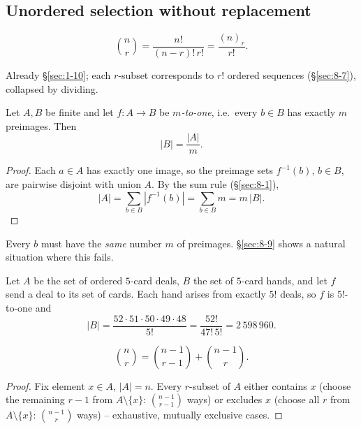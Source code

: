 \documentclass[11pt]{article}
\begin{document}
\subsection{Unordered selection without replacement}
\label{sec:8-8}

\begin{theorem}
\[
\binom{n}{r} = \frac{n!}{(n-r)!\,r!} = \frac{(n)_r}{r!}.
\]
\end{theorem}
\begin{note}
Already \S\ref{sec:1-10}; each $r$-subset corresponds to $r!$ ordered sequences (\S\ref{sec:8-7}), collapsed by dividing.
\end{note}

\bigskip
\begin{theorem}
\label{thm:divisionrule}
Let $A,B$ be finite and let $f:A\to B$ be \emph{$m$-to-one}, i.e.\ every $b\in B$ has exactly $m$ preimages. Then
\[
|B| = \frac{|A|}{m}.
\]
\end{theorem}
\begin{proof}
Each $a\in A$ has exactly one image, so the preimage sets $f^{-1}(b)$, $b\in B$, are pairwise disjoint with union $A$. By the sum rule (\S\ref{sec:8-1}),
\[
|A| = \sum_{b\in B}\left|f^{-1}(b)\right| = \sum_{b\in B} m = m\,|B|.
\]
\end{proof}
\begin{note}
Every $b$ must have the \emph{same} number $m$ of preimages. \S\ref{sec:8-9} shows a natural situation where this fails.
\end{note}

\begin{example}
Let $A$ be the set of ordered $5$-card deals, $B$ the set of $5$-card hands, and let $f$ send a deal to its set of cards. Each hand arises from exactly $5!$ deals, so $f$ is $5!$-to-one and
\[
|B| = \frac{52\cdot51\cdot50\cdot49\cdot48}{5!} = \frac{52!}{47!\,5!} = 2\,598\,960.
\]
\end{example}

\bigskip
\begin{theorem}
\[
\binom{n}{r} = \binom{n-1}{r-1} + \binom{n-1}{r}.
\]
\end{theorem}
\begin{proof}
Fix element $x\in A$, $|A|=n$. Every $r$-subset of $A$ either contains $x$ (choose the remaining $r-1$ from $A\setminus\{x\}$: $\binom{n-1}{r-1}$ ways) or excludes $x$ (choose all $r$ from $A\setminus\{x\}$: $\binom{n-1}{r}$ ways) -- exhaustive, mutually exclusive cases.
\end{proof}
\end{document}
